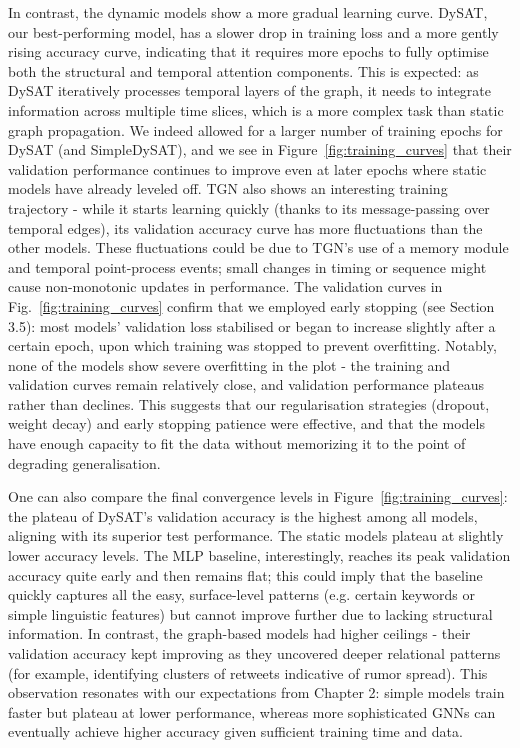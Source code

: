 \documentclass{cshonours}
\begin{document}
In contrast, the dynamic models show a more gradual learning curve. DySAT, our best-performing model, has a slower drop in training loss and a more gently rising accuracy curve, indicating that it requires more epochs to fully optimise both the structural and temporal attention components. This is expected: as DySAT iteratively processes temporal layers of the graph, it needs to integrate information across multiple time slices, which is a more complex task than static graph propagation. We indeed allowed for a larger number of training epochs for DySAT (and SimpleDySAT), and we see in Figure~\ref{fig:training_curves} that their validation performance continues to improve even at later epochs where static models have already leveled off. TGN also shows an interesting training trajectory - while it starts learning quickly (thanks to its message-passing over temporal edges), its validation accuracy curve has more fluctuations than the other models. These fluctuations could be due to TGN's use of a memory module and temporal point-process events; small changes in timing or sequence might cause non-monotonic updates in performance. The validation curves in Fig.~\ref{fig:training_curves} confirm that we employed early stopping (see Section 3.5): most models' validation loss stabilised or began to increase slightly after a certain epoch, upon which training was stopped to prevent overfitting. Notably, none of the models show severe overfitting in the plot - the training and validation curves remain relatively close, and validation performance plateaus rather than declines. This suggests that our regularisation strategies (dropout, weight decay) and early stopping patience were effective, and that the models have enough capacity to fit the data without memorizing it to the point of degrading generalisation.



One can also compare the final convergence levels in Figure~\ref{fig:training_curves}: the plateau of DySAT's validation accuracy is the highest among all models, aligning with its superior test performance. The static models plateau at slightly lower accuracy levels. The MLP baseline, interestingly, reaches its peak validation accuracy quite early and then remains flat; this could imply that the baseline quickly captures all the easy, surface-level patterns (e.g. certain keywords or simple linguistic features) but cannot improve further due to lacking structural information. In contrast, the graph-based models had higher ceilings - their validation accuracy kept improving as they uncovered deeper relational patterns (for example, identifying clusters of retweets indicative of rumor spread). This observation resonates with our expectations from Chapter 2: simple models train faster but plateau at lower performance, whereas more sophisticated GNNs can eventually achieve higher accuracy given sufficient training time and data.
\end{document}
